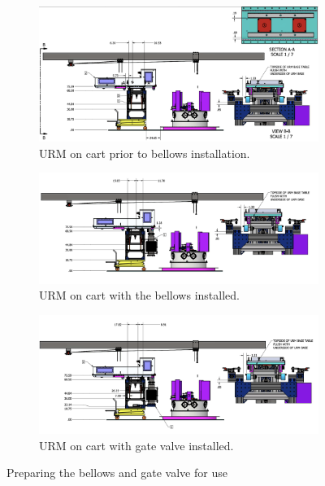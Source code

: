 \documentclass[11pt]{article}
\begin{document}
\begin{figure}
  \begin{subfigure}{0.9\textwidth}
    \includegraphics[width=\textwidth]{Figures/URMSecuredPreBellowsInstall}
    \caption{URM on cart prior to bellows installation.}
    \label{fig:URMpreBellows}
  \end{subfigure}
  \begin{subfigure}{0.9\textwidth}
    \includegraphics[width=\textwidth]{Figures/URMSecuredBellowsInstalled}
    \caption{URM on cart with the bellows installed.}
    \label{fig:URMpostBellows}
  \end{subfigure}
  \begin{subfigure}{0.9\textwidth}
    \includegraphics[width=\textwidth]{Figures/URMSecuredGateValveInstalled}
    \caption{URM on cart with gate valve installed.}
    \label{fig:URMwithGateValve}
  \end{subfigure}
  \caption{Preparing the bellows and gate valve for use}
  \label{fig:BellowsSteps}
\end{figure}
\end{document}
